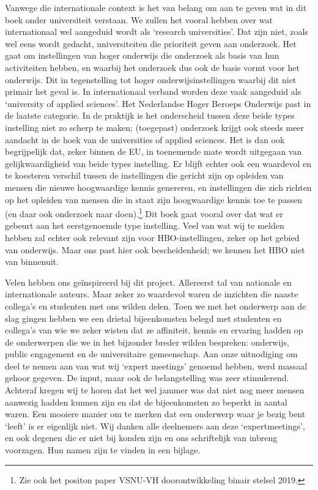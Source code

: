 \documentclass[empirical, authordate, ]{new-jote-article}
\begin{document}
	Vanwege die internationale context is het van belang om aan te geven wat in dit boek onder universiteit verstaan. We zullen het vooral hebben over wat internationaal wel aangeduid wordt als ‘research universities'. Dat zijn niet, zoals wel eens wordt gedacht, universiteiten die prioriteit geven aan onderzoek. Het gaat om instellingen van hoger onderwijs die onderzoek als basis van hun activiteiten hebben, en waarbij het onderzoek dus ook de basis vormt voor het onderwijs. Dit in tegenstelling tot hoger onderwijsinstellingen waarbij dit niet primair het geval is. In internationaal verband worden deze vaak aangeduid als ‘university of applied sciences'. Het Nederlandse Hoger Beroeps Onderwijs past in de laatste categorie. In de praktijk is het onderscheid tussen deze beide types instelling niet zo scherp te maken; (toegepast) onderzoek krijgt ook steeds meer aandacht in de hoek van de universities of applied sciences. Het is dan ook begrijpelijk dat, zeker binnen de EU, in toenemende mate wordt uitgegaan van gelijkwaardigheid van beide types instelling. Er blijft echter ook een waardevol en te koesteren verschil tussen de instellingen die gericht zijn op opleiden van mensen die nieuwe hoogwaardige kennis genereren, en instellingen die zich richten op het opleiden van mensen die in staat zijn hoogwaardige kennis toe te passen (en daar ook onderzoek naar doen).\footnote{Zie ook het positon paper VSNU-VH doorontwikkeling binair stelsel 2019.} Dit boek gaat vooral over dat wat er gebeurt aan het eerstgenoemde type instelling. Veel van wat wij te melden hebben zal echter ook relevant zijn voor HBO-instellingen, zeker op het gebied van onderwijs. Maar ons past hier ook bescheidenheid; we kennen het HBO niet van binnenuit.



	Velen hebben ons geïnspireerd bij dit project. Allereerst tal van nationale en internationale auteurs. Maar zeker zo waardevol waren de inzichten die naaste collega's en studenten met ons wilden delen. Toen we met het onderwerp aan de slag gingen hebben we een drietal bijeenkomsten belegd met studenten en collega's van wie we zeker wisten dat ze affiniteit, kennis en ervaring hadden op de onderwerpen die we in het bijzonder breder wilden bespreken: onderwijs, public engagement en de universitaire gemeenschap. Aan onze uitnodiging om deel te nemen aan van wat wij ‘expert meetings' genoemd hebben, werd massaal gehoor gegeven. De input, maar ook de belangstelling was zeer stimulerend. Achteraf kregen wij te horen dat het wel jammer was dat niet nog meer mensen aanwezig hadden kunnen zijn en dat de bijeenkomsten zo beperkt in aantal waren. Een mooiere manier om te merken dat een onderwerp waar je bezig bent ‘leeft' is er eigenlijk niet. Wij danken alle deelnemers aan deze ‘expertmeetings', en ook degenen die er niet bij konden zijn en ons schriftelijk van inbreng voorzagen. Hun namen zijn te vinden in een bijlage.
\end{document}
